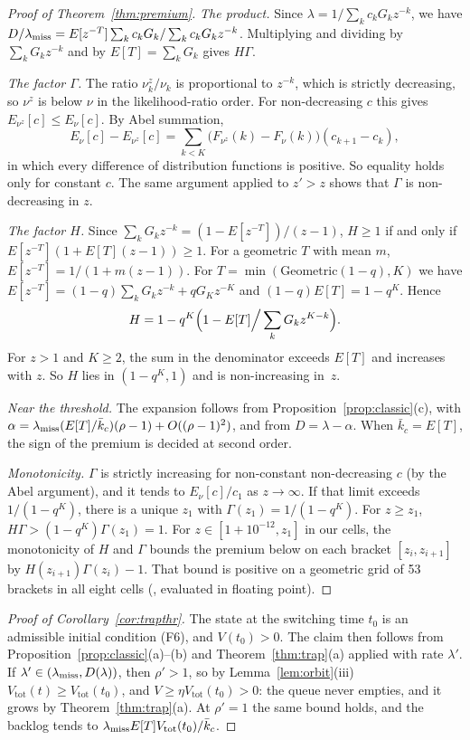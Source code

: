 \begin{proof}[Proof of Theorem~\ref{thm:premium}]
\emph{The product.} Since $\lambda=1/\sum_kc_kG_kz^{-k}$, we have
$D/\lambda_{\mathrm{miss}}=E[z^{-T}]\sum_kc_kG_k/\sum_kc_kG_kz^{-k}$. Multiplying and dividing by $\sum_kG_kz^{-k}$ and by
$E[T]=\sum_kG_k$ gives $H\Gamma$.

\emph{The factor $\Gamma$.} The ratio $\nu^z_k/\nu_k$ is proportional to $z^{-k}$, which is strictly decreasing, so $\nu^z$ is
below $\nu$ in the likelihood-ratio order. For non-decreasing $c$ this gives $E_{\nu^z}[c]\le E_\nu[c]$. By Abel summation,
\[
E_\nu[c]-E_{\nu^z}[c]=\sum_{k<K}\bigl(F_{\nu^z}(k)-F_\nu(k)\bigr)(c_{k+1}-c_k),
\]
in which every difference of distribution functions is positive. So equality holds only for constant $c$. The same argument
applied to $z'>z$ shows that $\Gamma$ is non-decreasing in $z$.

\emph{The factor $H$.} Since $\sum_kG_kz^{-k}=(1-E[z^{-T}])/(z-1)$, $H\ge1$ if and only if $E[z^{-T}](1+E[T](z-1))\ge1$.
For a geometric $T$ with mean $m$, $E[z^{-T}]=1/(1+m(z-1))$. For $T=\min(\mathrm{Geometric}(1-q),K)$ we have
$E[z^{-T}]=(1-q)\sum_kG_kz^{-k}+qG_Kz^{-K}$ and $(1-q)E[T]=1-q^K$. Hence
\[
H=1-q^K\Bigl(1-E[T]\Big/\sum_kG_kz^{K-k}\Bigr).
\]
For $z>1$ and $K\ge2$, the sum in the denominator exceeds $E[T]$ and increases with $z$. So $H$ lies in $(1-q^K,1)$ and
is non-increasing in~$z$.

\emph{Near the threshold.} The expansion follows from Proposition~\ref{prop:classic}(c), with
$\alpha=\lambda_{\mathrm{miss}}(E[T]/\bar k_c)(\rho-1)+O((\rho-1)^2)$, and from $D=\lambda-\alpha$. When $\bar k_c=E[T]$, the sign of the
premium is decided at second order.

\emph{Monotonicity.} $\Gamma$ is strictly increasing for non-constant non-decreasing $c$ (by the Abel argument), and it
tends to $E_\nu[c]/c_1$ as $z\to\infty$. If that limit exceeds $1/(1-q^K)$, there is a unique $z_1$ with
$\Gamma(z_1)=1/(1-q^K)$. For $z\ge z_1$, $H\Gamma>(1-q^K)\Gamma(z_1)=1$. For $z\in[1+10^{-12},z_1]$ in our cells, the
monotonicity of $H$ and $\Gamma$ bounds the premium below on each bracket $[z_i,z_{i+1}]$ by $H(z_{i+1})\Gamma(z_i)-1$. That
bound is positive on a geometric grid of 53 brackets in all eight cells (,
evaluated in floating point).
\end{proof}

\begin{proof}[Proof of Corollary~\ref{cor:trapthr}]
The state at the switching time $t_0$ is an admissible initial condition (F6), and $V(t_0)>0$. The claim then follows
from Proposition~\ref{prop:classic}(a)--(b) and Theorem~\ref{thm:trap}(a) applied with rate $\lambda'$. If $\lambda'\in(\lambda_{\mathrm{miss}},D(\lambda))$, then $\rho'>1$, so
by Lemma~\ref{lem:orbit}(iii) $V_{\mathrm{tot}}(t)\ge V_{\mathrm{tot}}(t_0)$, and $V\ge\eta V_{\mathrm{tot}}(t_0)>0$:
the queue never empties, and it grows by Theorem~\ref{thm:trap}(a). At $\rho'=1$ the same bound holds, and the backlog tends
to $\lambda_{\mathrm{miss}} E[T]V_{\mathrm{tot}}(t_0)/\bar k_c$.
\end{proof}

